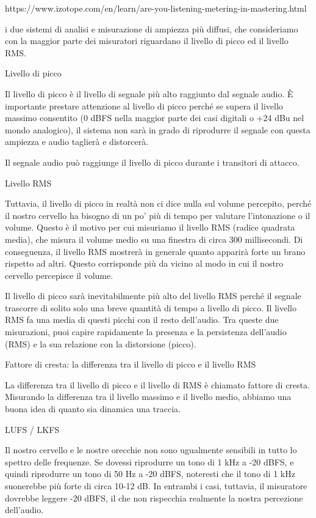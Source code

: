 https://www.izotope.com/en/learn/are-you-listening-metering-in-mastering.html

i due sistemi di analisi e misurazione di ampiezza più diffusi, che consideriamo
con la maggior parte dei misuratori riguardano il livello di picco ed il livello
RMS.

Livello di picco

Il livello di picco è il livello di segnale più alto raggiunto dal segnale audio.
È importante prestare attenzione al livello di picco perché se supera il livello
massimo consentito (0 dBFS nella maggior parte dei casi digitali o +24 dBu nel
mondo analogico), il sistema non sarà in grado di riprodurre il segnale con
questa ampiezza e audio taglierà e distorcerà.

Il segnale audio può raggiunge il livello di picco durante i transitori di attacco.

Livello RMS

Tuttavia, il livello di picco in realtà non ci dice nulla sul volume percepito,
perché il nostro cervello ha bisogno di un po' più di tempo per valutare
l'intonazione o il volume. Questo è il motivo per cui misuriamo il livello
RMS (radice quadrata media), che misura il volume medio su una finestra di circa
300 millisecondi. Di conseguenza, il livello RMS mostrerà in generale quanto
apparirà forte un brano rispetto ad altri. Questo corrisponde più da vicino al
modo in cui il nostro cervello percepisce il volume.

Il livello di picco sarà inevitabilmente più alto del livello RMS perché il
segnale trascorre di solito solo una breve quantità di tempo a livello di picco.
Il livello RMS fa una media di questi picchi con il resto dell'audio. Tra queste
due misurazioni, puoi capire rapidamente la presenza e la persistenza dell'audio
(RMS) e la sua relazione con la distorsione (picco).

Fattore di cresta: la differenza tra il livello di picco e il livello RMS

La differenza tra il livello di picco e il livello di RMS è chiamato fattore di
cresta. Misurando la differenza tra il livello massimo e il livello medio,
abbiamo una buona idea di quanto sia dinamica una traccia.

LUFS / LKFS

Il nostro cervello e le nostre orecchie non sono ugualmente sensibili in tutto
lo spettro delle frequenze. Se dovessi riprodurre un tono di 1 kHz a -20 dBFS,
e quindi riprodurre un tono di 50 Hz a -20 dBFS, noteresti che il tono di 1 kHz
suonerebbe più forte di circa 10-12 dB. In entrambi i casi, tuttavia, il
misuratore dovrebbe leggere -20 dBFS, il che non rispecchia realmente la nostra
percezione dell'audio.

